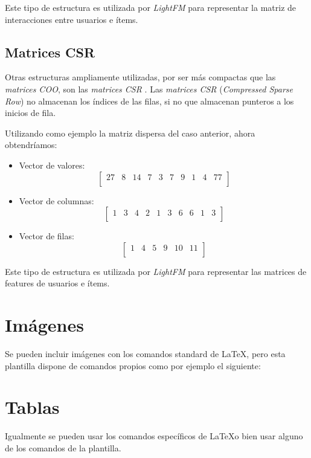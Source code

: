 Este tipo de estructura es utilizada por \textit{LightFM} para representar la matriz de interacciones entre usuarios e ítems.

\subsection{Matrices CSR}\label{matrices-csr}
Otras estructuras ampliamente utilizadas, por ser más compactas que las \textit{matrices COO}, son las \textit{matrices CSR} \cite{csr-matrix}. Las \textit{matrices CSR} (\textit{Compressed Sparse Row}) no almacenan los índices de las filas, si no que almacenan punteros a los inicios de fila.

Utilizando como ejemplo la matriz dispersa del caso anterior, ahora obtendríamos:
\begin{itemize}
\tightlist
\item Vector de valores: \[\begin{bmatrix} 27&8&14&7&3&7&9&1&4&77\\\end{bmatrix}\]
\item Vector de columnas: \[\begin{bmatrix} 1&3&4&2&1&3&6&6&1&3\\
\end{bmatrix}\]
\item Vector de filas: \[\begin{bmatrix} 1&4&5&9&10&11\\\end{bmatrix}\]
\end{itemize}

Este tipo de estructura es utilizada por \textit{LightFM} para representar las matrices de features de usuarios e ítems.

\section{Imágenes}

Se pueden incluir imágenes con los comandos standard de \LaTeX, pero esta plantilla dispone de comandos propios como por ejemplo el siguiente:


\section{Tablas}

Igualmente se pueden usar los comandos específicos de \LaTeX o bien usar alguno de los comandos de la plantilla.


